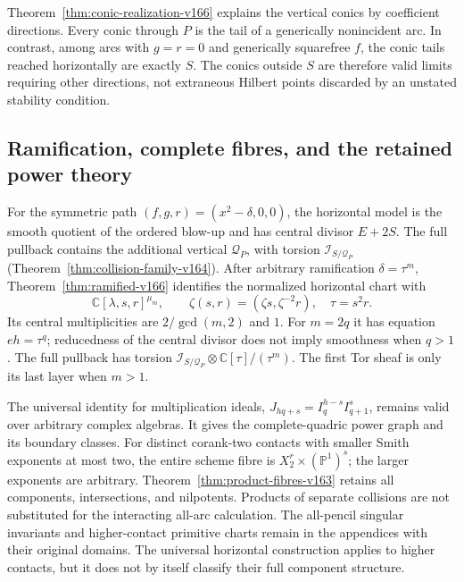 \documentclass[11pt,reqno]{amsart}
\numberwithin{equation}{section}
\theoremstyle{definition}\newtheorem{definition}[theorem]{Definition}
\theoremstyle{remark}\newtheorem{remark}[theorem]{Remark}
\newcommand{\C}{\mathbb C}\newcommand{\Q}{\mathbb Q}
\newcommand{\Pj}{\mathbb P}\newcommand{\A}{\mathbb A}
\begin{document}
Theorem~\ref{thm:conic-realization-v166} explains the vertical
conics by coefficient directions. Every conic through $P$ is the
tail of a generically nonincident arc. In contrast, among arcs
with $g=r=0$ and generically squarefree $f$, the conic tails reached
horizontally are exactly $S$. The conics outside $S$ are therefore
valid limits requiring other directions, not extraneous Hilbert
points discarded by an unstated stability condition.

\subsection{Ramification, complete fibres, and the retained power theory}
For the symmetric path $(f,g,r)=(x^2-\delta,0,0)$, the horizontal
model is the smooth quotient of the ordered blow-up and has central
divisor $E+2S$. The full pullback contains the additional vertical
$\mathcal Q_P$, with torsion $\mathcal I_{S/\mathcal Q_P}$
(Theorem~\ref{thm:collision-family-v164}). After arbitrary
ramification $\delta=\tau^m$, Theorem~\ref{thm:ramified-v166}
identifies the normalized horizontal chart with
\[
 \C[\lambda,s,r]^{\mu_m},\qquad
 \zeta(s,r)=(\zeta s,\zeta^{-2}r),\quad\tau=s^2r.
\]
Its central multiplicities are $2/\gcd(m,2)$ and $1$. For $m=2q$
it has equation $eh=\tau^q$; reducedness of the central divisor
does not imply smoothness when $q>1$. The full pullback has torsion
$\mathcal I_{S/\mathcal Q_P}\otimes\C[\tau]/(\tau^m)$.
The first Tor sheaf is only its last layer when $m>1$.

The universal identity for multiplication ideals,
$J_{hq+s}=I_q^{h-s}I_{q+1}^s$, remains valid over arbitrary complex
algebras. It gives the complete-quadric power graph and its boundary
classes. For distinct corank-two contacts with smaller Smith
exponents at most two, the entire scheme fibre is
$X_2^r\times(\Pj^1)^s$; the larger exponents are arbitrary.
Theorem~\ref{thm:product-fibres-v163} retains all components,
intersections, and nilpotents. Products of separate collisions
are not substituted for the interacting all-arc calculation.
The all-pencil singular invariants and higher-contact primitive
charts remain in the appendices with their original domains.
The universal horizontal construction applies to higher contacts,
but it does not by itself classify their full component structure.
\end{document}
